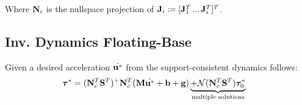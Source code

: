 \documentclass[a4paper, 8pt]{extarticle}
\begin{document}
\begin{multicols*}{3}
Where ${\bf N}_i$ is the nullspace projection of ${\bf J}_i \coloneqq [{\bf J}_1^T \, ... \, {\bf J}_i^T]^T$.


\subsection{Inv. Dynamics Floating-Base}
Given a desired acceleration $\dot{\bf u^*}$ from the support-consistent dynamics follows:
\begin{align*}
{\bm \tau}^* &= ({\bf N}^T_c {\bf S}^T )^+{\bf N}_c^T({\bf M}\dot{\bf u^*} + {\bf b + g}) \underbrace{+  \mathcal{N}({\bf N}^T_c {\bf S}^T)\bm\tau^*_0}_\text{multiple solutions}
\end{align*}

\end{multicols*}
\end{document}
